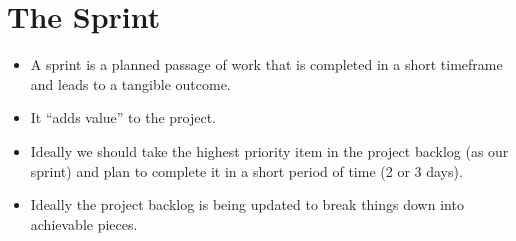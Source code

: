 \documentclass[a4paper,12pt]{article}
\begin{document}
\section{The Sprint}
\begin{itemize}
	\item A sprint is a planned passage of work that is completed in a short timeframe and leads to a tangible outcome.
	\item It ``adds value'' to the project.
	\item Ideally we should take the highest priority item in the project backlog (as our sprint) and plan to complete it in a short period of time (2 or 3 days).
	\item Ideally the project backlog is being updated to break things down into achievable pieces.
\end{itemize}
\end{document}

